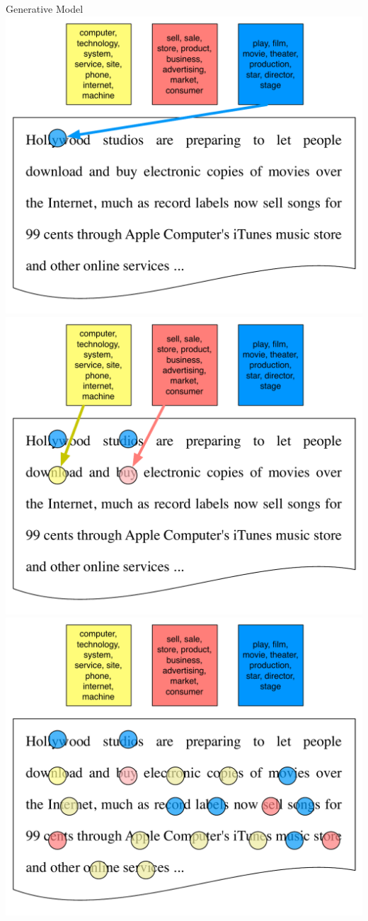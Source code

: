 \begin{frame}{Generative Model}
	\only<4> {   \includegraphics[width=.8\linewidth]{topic_models/inference_1}  }
	\only<5> {   \includegraphics[width=.8\linewidth]{topic_models/inference_2}  }
	\only<6> {   \includegraphics[width=.8\linewidth]{topic_models/inference_3}  }


\end{frame}

